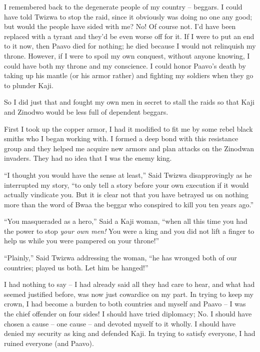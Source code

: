 I remembered back to the degenerate people of my country -- beggars. I could have told Twi\-zwa to stop the raid, since it obviously was doing no one any good; but would the people have sided with me? No! Of course not. I'd have been replaced with a tyrant and they'd be even worse off for it. If I were to put an end to it now, then Paa\-vo died for nothing; he died because I would not relinquish my throne. However, if I were to spoil my own conquest, without anyone knowing, I could have both my throne and my conscience. I could honor Paa\-vo's death by taking up his mantle (or his armor rather) and fighting my soldiers when they go to plunder Ka\-ji.

So I did just that and fought my own men in secret to stall the raids so that Ka\-ji and Zi\-no\-dwo would be less full of dependent beggars.

First I took up the copper armor, I had it modified to fit me by some rebel black smiths who I began working with. I formed a deep bond with this resistance group and they helped me acquire new armors and plan attacks on the Zi\-no\-dwan invaders. They had no idea that I was the enemy king.

\tbreak

``I thought you would have the sense at least,'' Said Twi\-zwa disapprovingly as he interrupted my story, ``to only tell a story before your own execution if it would actually vindicate you. But it is clear not that you have betrayed us on nothing more than the word of Bwaa the beggar who conspired to kill you ten years ago.''

``You masqueraded as a hero,'' Said a Ka\-ji woman, ``when all this time you had the power to stop \emph{your own men!} You were a king and you did not lift a finger to help us while you were pampered on your throne!''

``Plainly,'' Said Twi\-zwa addressing the woman, ``he has wronged both of our countries; played us both. Let him be hanged!''

I had nothing to say -- I had already said all they had care to hear, and what had seemed justified before, was now just cowardice on my part. In trying to keep my crown, I had become a burden to both countries and myself and Paa\-vo -- I was the chief offender on four sides! I should have tried diplomacy; No. I should have chosen a cause -- one cause -- and devoted myself to it wholly. I should have denied my security as king and defended Ka\-ji. In trying to satisfy everyone, I had ruined everyone (and Paa\-vo).

